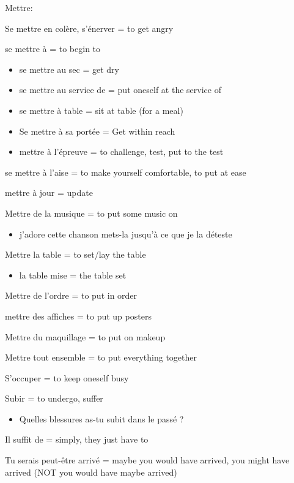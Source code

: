 {Mettre:}

{Se mettre en colère, s'énerver = to get angry~}

{se mettre à = to begin to}

\begin{itemize}
\item
  {se mettre au sec = get dry}
\item
  {se mettre au service de = put oneself at the service of}
\item
  {se mettre à table = sit at table (for a meal)}
\item
  {Se mettre à sa portée = Get within reach}
\item
  {mettre à l'épreuve = to challenge, test, put to the test}
\end{itemize}

{se mettre à l'aise = to make yourself comfortable, to put at ease}

{mettre à jour = update}

{Mettre de la musique = to put some music on}

\begin{itemize}
\item
  {j'adore cette chanson mets-la jusqu'à ce que je la déteste}
\end{itemize}

{Mettre la table = to set/lay the table}

\begin{itemize}
\item
  {la table mise = the table set}
\end{itemize}

{Mettre de l'ordre = to put in order~}

mettre des affiches = to put up posters

Mettre du maquillage = to put on makeup~

Mettre tout ensemble = to put everything together~

{S'occuper = to keep oneself busy~}

{Subir = to undergo, suffer}

\begin{itemize}
\item
  {Quelles blessures as-tu subit dans le passé ?}
\end{itemize}

{Il suffit de = simply, they just have to}

{Tu serais peut-être arrivé = maybe you would have arrived, you might
have arrived (NOT you would have maybe arrived)}

